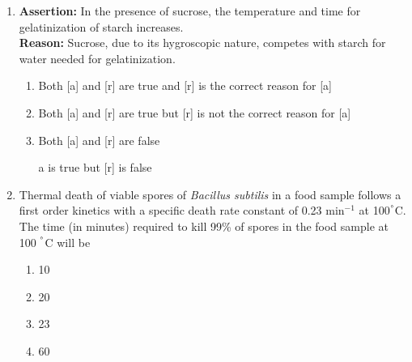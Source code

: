 \documentclass[journal,12pt,onecolumn]{IEEEtran}
\theoremstyle{remark}
\begin{document}
\begin{enumerate}
\begin{multicols}{2}
Group II
\begin{enumerate}[label=\arabic*.]
    \item Sol
    \item Emulsion
    \item Gel
    \item Solid foam
\end{enumerate}
\end{multicols}

\begin{enumerate}
    \item P-2, Q-1, R-2, S-3
    \item P-3, Q-2, R-4, S-1
    \item P-2, Q-3, R-4, S-1
    \item P-2, Q-1, R-4, S-3
\end{enumerate}


\item \textbf{Assertion:} In the presence of sucrose, the temperature and time for gelatinization of starch increases.\\
\textbf{Reason:} Sucrose, due to its hygroscopic nature, competes with starch for water needed for gelatinization.
\begin{multicols}{2}
\begin{enumerate}
\item Both [a] and [r] are true and [r] is the correct reason for [a]
\item Both [a] and [r] are true but [r] is not the correct reason for [a]
\item Both [a] and [r] are false
\item [a] is true but [r] is false
\end{enumerate}
\end{multicols}

\item Thermal death of viable spores of \textit{Bacillus subtilis} in a food sample follows a first order kinetics with a specific death rate constant of 0.23 min$^{-1}$ at 100$^\degree$C. The time (in minutes) required to kill 99\% of spores in the food sample at 100 $^\degree$C will be
\begin{multicols}{2}
\begin{enumerate}
\item 10
\item 20
\item 23
\item 60
\end{enumerate}
\end{multicols}


\end{enumerate}
\end{document}
